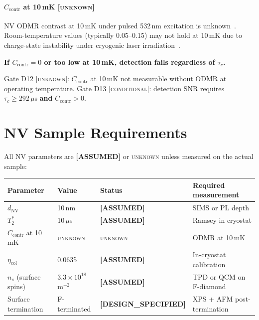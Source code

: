 \documentclass[12pt,a4paper]{article}
\newcommand{\conditional}{\textsc{conditional}}
\newcommand{\unknown}{\textsc{unknown}}
\newcommand{\assumed}{\textbf{[ASSUMED]}}
\newcommand{\designspec}{\textbf{[DESIGN\_SPECIFIED]}}
\begin{document}
\paragraph{$C_\mathrm{contr}$ at 10\,mK [\unknown{}]}
NV ODMR contrast at 10\,mK under pulsed 532\,nm excitation is unknown~\cite{Sangtawesin2019,TrusheimPRL2020}.
Room-temperature values (typically 0.05--0.15) may not hold at 10\,mK due to
charge-state instability under cryogenic laser irradiation~\cite{RondinRMP2014}.

\textbf{If $C_\mathrm{contr} = 0$ or too low at 10\,mK, detection fails
regardless of $\tau_c$.}

Gate D12 [\unknown{}]: $C_\mathrm{contr}$ at 10\,mK not measurable without
ODMR at operating temperature.
Gate D13 [\conditional{}]: detection SNR requires $\tau_c \geq 292\,\mu$s \textbf{and}
$C_\mathrm{contr} > 0$.

\section{NV Sample Requirements}
\label{sec:nv}

All NV parameters are \assumed{} or \unknown{} unless measured on the actual sample:

\begin{center}
\small
\begin{tabular}{llll}
\toprule
Parameter & Value & Status & Required measurement \\
\midrule
$d_\mathrm{NV}$ & 10\,nm & \assumed{} & SIMS or PL depth \\
$T_2^*$ & 10\,$\mu$s & \assumed{} & Ramsey in cryostat \\
$C_\mathrm{contr}$ at 10\,mK & \unknown{} & \unknown{} & ODMR at 10\,mK \\
$\eta_\mathrm{col}$ & 0.0635 & \assumed{} & In-cryostat calibration \\
$n_s$ (surface spins) & $3.3\times10^{18}$\,m$^{-2}$ & \assumed{} & TPD or QCM on F-diamond \\
Surface termination & F-terminated & \designspec{} & XPS + AFM post-termination \\
\bottomrule
\end{tabular}
\end{center}

\end{document}
